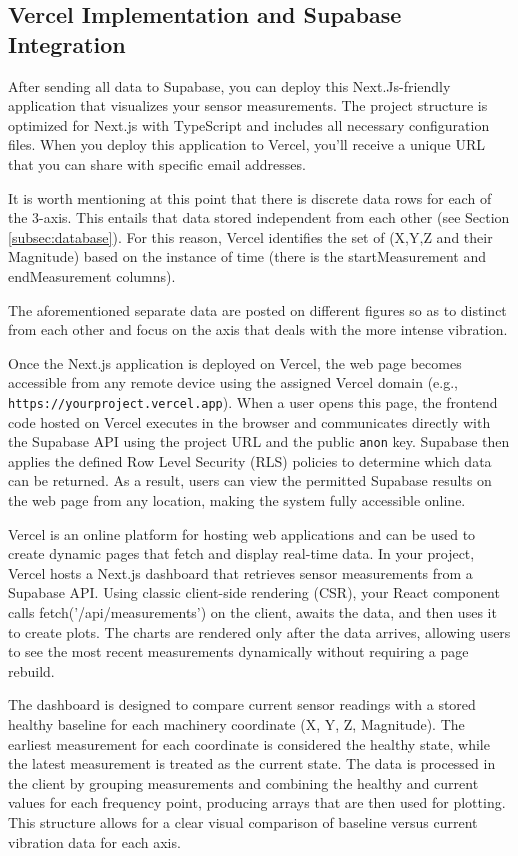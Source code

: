\subsection{Vercel Implementation and Supabase Integration}
	\label{subsec:vercelsec}
{
	After sending all data to Supabase, you can deploy this Next.Js-friendly application that visualizes your sensor measurements. The project structure is optimized for Next.js with TypeScript and includes all necessary configuration files. When you deploy this application to Vercel, you'll receive a unique URL that you can share with specific email addresses.
	
	It is worth mentioning at this point that there is discrete data rows for each of the 3-axis. This entails that data stored independent from each other (see Section \ref{subsec:database}). For this reason, Vercel identifies the set of (X,Y,Z and their Magnitude) based on the instance of time (there is the startMeasurement and endMeasurement columns).
	
	The aforementioned separate data are posted on different figures so as to distinct from each other and focus on the axis that deals with the more intense vibration.
	
	
	Once the Next.js application is deployed on Vercel, the web page becomes accessible from any remote device 
	using the assigned Vercel domain (e.g., \texttt{https://yourproject.vercel.app}). When a user opens this page, the frontend code hosted on Vercel executes in the browser and communicates directly with the Supabase API  using the project URL and the public \texttt{anon} key. Supabase then applies the defined Row Level Security (RLS) policies to determine which data can be returned. As a result, users can view the permitted Supabase results on the web page from any location, making the system fully accessible online.
	
	Vercel is an online platform for hosting web applications and can be used to create dynamic pages that fetch and display real-time data. In your project, Vercel hosts a Next.js dashboard that retrieves sensor measurements from a Supabase API. Using classic client-side rendering (CSR), your React component calls fetch('/api/measurements') on the client, awaits the data, and then uses it to create plots. The charts are rendered only after the data arrives, allowing users to see the most recent measurements dynamically without requiring a page rebuild.
	
	
	The dashboard is designed to compare current sensor readings with a stored healthy baseline for each machinery coordinate (X, Y, Z, Magnitude). The earliest measurement for each coordinate is considered the healthy state, while the latest measurement is treated as the current state. The data is processed in the client by grouping measurements and combining the healthy and current values for each frequency point, producing arrays that are then used for plotting. This structure allows for a clear visual comparison of baseline versus current vibration data for each axis.
		
}
